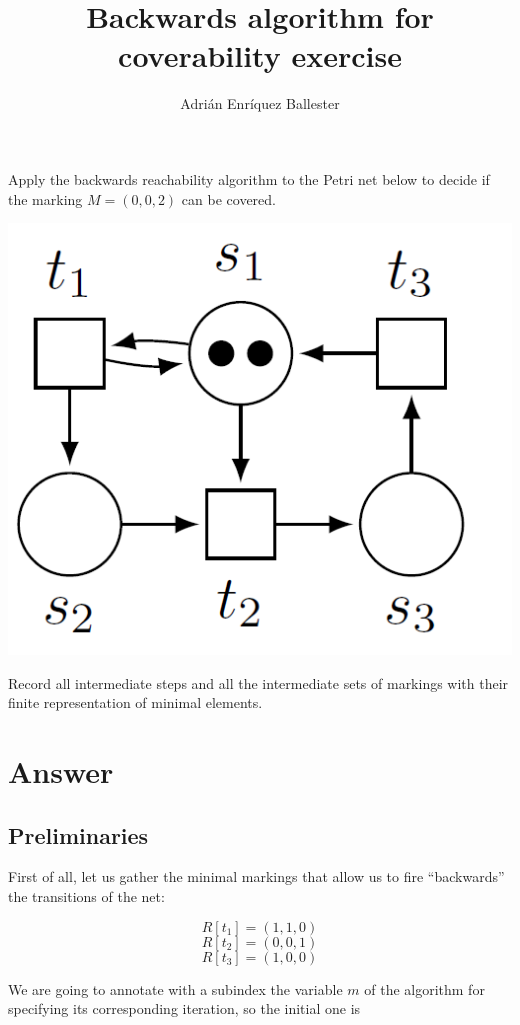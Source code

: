 \documentclass{article}
\title{Backwards algorithm for coverability exercise}
\author{Adrián Enríquez Ballester}
\begin{document}
\maketitle

Apply the backwards reachability algorithm to the Petri net 
below to decide if the marking $M = (0, 0, 2)$ can be covered.

\begin{center}
  \includegraphics[scale=0.4]{net}
\end{center}

Record all intermediate steps and all the intermediate sets of 
markings with their finite representation of minimal elements.

\section*{Answer}

\subsection*{Preliminaries}

First of all, let us gather the minimal markings that allow us 
to fire ``backwards'' the transitions of the net:

$$R[t_1] = (1, 1, 0)$$
$$R[t_2] = (0, 0, 1)$$
$$R[t_3] = (1, 0, 0)$$

We are going to annotate with a subindex the variable $m$ 
of the algorithm for specifying its corresponding iteration, 
so the initial one is
\end{document}

